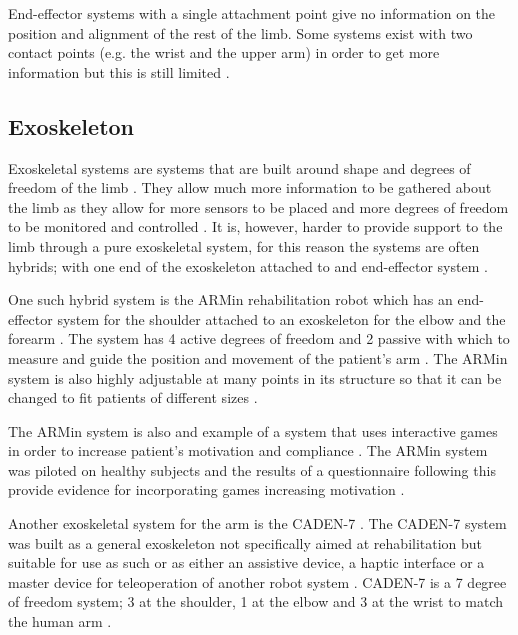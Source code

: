 \documentclass[journal]{IEEEtran}
\begin{document}
End-effector systems with a single attachment point give no information on the position and 
alignment of the rest of the limb. Some systems exist with two contact points (e.g. the wrist 
and the upper arm) in order to get more information but this is still limited \cite{AdvancesPush}.

\subsection{Exoskeleton}
Exoskeletal systems are systems that are built around shape and degrees of freedom of the limb \cite{AdvancesPush}. 
They allow much more information to be gathered about the limb as they allow for more sensors to be 
placed and more degrees of freedom to be monitored and controlled \cite{AdvancesPush}. It is, however, harder to 
provide support to the limb through a pure exoskeletal system, for this reason the systems are often 
hybrids; with one end of the exoskeleton attached to and end-effector system \cite{AdvancesPush}.

One such hybrid system is the ARMin rehabilitation robot which has an end-effector system for the 
shoulder attached to an exoskeleton for the elbow and the forearm \cite{ADLVE, ARMin}. The system has 4 active 
degrees of freedom and 2 passive with which to measure and guide the position and movement of 
the patient's arm \cite{ARMin}. The ARMin system is also highly adjustable at many points in its structure 
so that it can be changed to fit patients of different sizes \cite{ARMin}.

The ARMin system is also and example of a system that uses interactive games in order to increase 
patient's motivation and compliance \cite{ADLVE,ARMin}. The ARMin system was piloted on healthy subjects and 
the results of a questionnaire following this provide evidence for incorporating games increasing 
motivation \cite{ARMin}.

Another exoskeletal system for the arm is the CADEN-7 \cite{CADEN}. The CADEN-7 system was built as a 
general exoskeleton not specifically aimed at rehabilitation but suitable for use as such or as either an 
assistive device, a haptic interface or a master device for teleoperation of another robot system \cite{CADEN}. 
CADEN-7 is a 7 degree of freedom system; 3 at the shoulder, 1 at the elbow and 3 at the wrist to 
match the human arm \cite{CADEN}.
\end{document}
